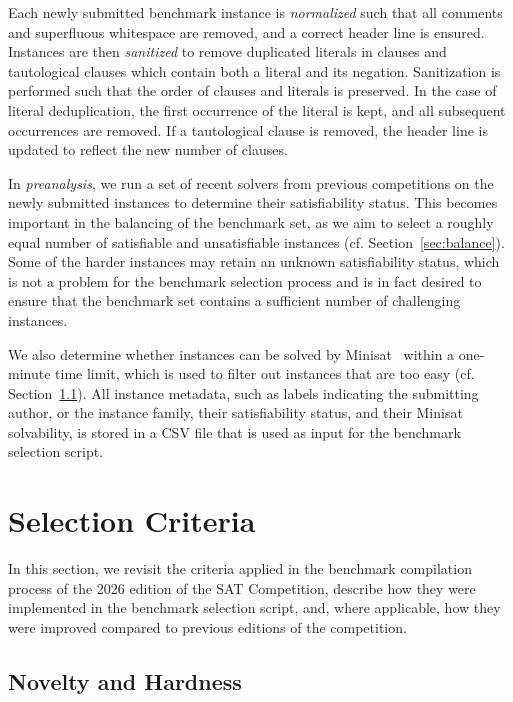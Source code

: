 \documentclass[conference]{IEEEtran}
\begin{document}
Each newly submitted benchmark instance is \emph{normalized} such that all comments and superfluous whitespace are removed, and a correct header line is ensured.
Instances are then \emph{sanitized} to remove duplicated literals in clauses and tautological clauses which contain both a literal and its negation.
Sanitization is performed such that the order of clauses and literals is preserved.
In the case of literal deduplication, the first occurrence of the literal is kept, and all subsequent occurrences are removed.
If a tautological clause is removed, the header line is updated to reflect the new number of clauses.

In \emph{preanalysis}, we run a set of recent solvers from previous competitions on the newly submitted instances to determine their satisfiability status.
This becomes important in the balancing of the benchmark set, as we aim to select a roughly equal number of satisfiable and unsatisfiable instances (cf. Section~\ref{sec:balance}).
Some of the harder instances may retain an unknown satisfiability status, which is not a problem for the benchmark selection process and is in fact desired to ensure that the benchmark set contains a sufficient number of challenging instances.

We also determine whether instances can be solved by Minisat~\cite{minisat} within a one-minute time limit, which is used to filter out instances that are too easy (cf. Section~\ref{sec:novelty}).
All instance metadata, such as labels indicating the submitting author, or the instance family, their satisfiability status, and their Minisat solvability, is stored in a CSV file that is used as input for the benchmark selection script.

\section{Selection Criteria}\label{sec:criteria}

In this section, we revisit the criteria applied in the benchmark compilation process of the 2026 edition of the SAT Competition, describe how they were implemented in the benchmark selection script, and, where applicable, how they were improved compared to previous editions of the competition.

\subsection{Novelty and Hardness}\label{sec:novelty}
\end{document}
